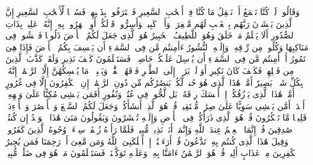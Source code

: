 \startbuffer[\q:67:10]
وَقَالُوا۟ لَوۡ كُنَّا نَسۡمَعُ أَوۡ نَعۡقِلُ مَا كُنَّا فِیۤ أَصۡحَٰبِ ٱلسَّعِیرِ%
\stopbuffer%
\startbuffer[\q:67:11]
فَٱعۡتَرَفُوا۟ بِذَنۢبِهِمۡ فَسُحۡقࣰا لِّأَصۡحَٰبِ ٱلسَّعِیرِ%
\stopbuffer%
\startbuffer[\q:67:12]
إِنَّ ٱلَّذِینَ یَخۡشَوۡنَ رَبَّهُم بِٱلۡغَیۡبِ لَهُم مَّغۡفِرَةࣱ وَأَجۡرࣱ كَبِیرࣱ%
\stopbuffer%
\startbuffer[\q:67:13]
وَأَسِرُّوا۟ قَوۡلَكُمۡ أَوِ ٱجۡهَرُوا۟ بِهِۦۤۖ إِنَّهُۥ عَلِیمُۢ بِذَاتِ ٱلصُّدُورِ%
\stopbuffer%
\startbuffer[\q:67:14]
أَلَا یَعۡلَمُ مَنۡ خَلَقَ وَهُوَ ٱللَّطِیفُ ٱلۡخَبِیرُ%
\stopbuffer%
\startbuffer[\q:67:15]
هُوَ ٱلَّذِی جَعَلَ لَكُمُ ٱلۡأَرۡضَ ذَلُولࣰا فَٱمۡشُوا۟ فِی مَنَاكِبِهَا وَكُلُوا۟ مِن رِّزۡقِهِۦۖ وَإِلَیۡهِ ٱلنُّشُورُ%
\stopbuffer%
\startbuffer[\q:67:16]
ءَأَمِنتُم مَّن فِی ٱلسَّمَاۤءِ أَن یَخۡسِفَ بِكُمُ ٱلۡأَرۡضَ فَإِذَا هِیَ تَمُورُ%
\stopbuffer%
\startbuffer[\q:67:17]
أَمۡ أَمِنتُم مَّن فِی ٱلسَّمَاۤءِ أَن یُرۡسِلَ عَلَیۡكُمۡ حَاصِبࣰاۖ فَسَتَعۡلَمُونَ كَیۡفَ نَذِیرِ%
\stopbuffer%
\startbuffer[\q:67:18]
وَلَقَدۡ كَذَّبَ ٱلَّذِینَ مِن قَبۡلِهِمۡ فَكَیۡفَ كَانَ نَكِیرِ%
\stopbuffer%
\startbuffer[\q:67:19]
أَوَ لَمۡ یَرَوۡا۟ إِلَى ٱلطَّیۡرِ فَوۡقَهُمۡ صَٰۤفَّٰتࣲ وَیَقۡبِضۡنَۚ مَا یُمۡسِكُهُنَّ إِلَّا ٱلرَّحۡمَٰنُۚ إِنَّهُۥ بِكُلِّ شَیۡءِۭ بَصِیرٌ%
\stopbuffer%
\startbuffer[\q:67:20]
أَمَّنۡ هَٰذَا ٱلَّذِی هُوَ جُندࣱ لَّكُمۡ یَنصُرُكُم مِّن دُونِ ٱلرَّحۡمَٰنِۚ إِنِ ٱلۡكَٰفِرُونَ إِلَّا فِی غُرُورٍ%
\stopbuffer%
\startbuffer[\q:67:21]
أَمَّنۡ هَٰذَا ٱلَّذِی یَرۡزُقُكُمۡ إِنۡ أَمۡسَكَ رِزۡقَهُۥۚ بَل لَّجُّوا۟ فِی عُتُوࣲّ وَنُفُورٍ%
\stopbuffer%
\startbuffer[\q:67:22]
أَفَمَن یَمۡشِی مُكِبًّا عَلَىٰ وَجۡهِهِۦۤ أَهۡدَىٰۤ أَمَّن یَمۡشِی سَوِیًّا عَلَىٰ صِرَٰطࣲ مُّسۡتَقِیمࣲ%
\stopbuffer%
\startbuffer[\q:67:23]
قُلۡ هُوَ ٱلَّذِیۤ أَنشَأَكُمۡ وَجَعَلَ لَكُمُ ٱلسَّمۡعَ وَٱلۡأَبۡصَٰرَ وَٱلۡأَفۡءِدَةَۚ قَلِیلࣰا مَّا تَشۡكُرُونَ%
\stopbuffer%
\startbuffer[\q:67:24]
قُلۡ هُوَ ٱلَّذِی ذَرَأَكُمۡ فِی ٱلۡأَرۡضِ وَإِلَیۡهِ تُحۡشَرُونَ%
\stopbuffer%
\startbuffer[\q:67:25]
وَیَقُولُونَ مَتَىٰ هَٰذَا ٱلۡوَعۡدُ إِن كُنتُمۡ صَٰدِقِینَ%
\stopbuffer%
\startbuffer[\q:67:26]
قُلۡ إِنَّمَا ٱلۡعِلۡمُ عِندَ ٱللَّهِ وَإِنَّمَاۤ أَنَا۠ نَذِیرࣱ مُّبِینࣱ%
\stopbuffer%
\startbuffer[\q:67:27]
فَلَمَّا رَأَوۡهُ زُلۡفَةࣰ سِیۤءَتۡ وُجُوهُ ٱلَّذِینَ كَفَرُوا۟ وَقِیلَ هَٰذَا ٱلَّذِی كُنتُم بِهِۦ تَدَّعُونَ%
\stopbuffer%
\startbuffer[\q:67:28]
قُلۡ أَرَءَیۡتُمۡ إِنۡ أَهۡلَكَنِیَ ٱللَّهُ وَمَن مَّعِیَ أَوۡ رَحِمَنَا فَمَن یُجِیرُ ٱلۡكَٰفِرِینَ مِنۡ عَذَابٍ أَلِیمࣲ%
\stopbuffer%
\startbuffer[\q:67:29]
قُلۡ هُوَ ٱلرَّحۡمَٰنُ ءَامَنَّا بِهِۦ وَعَلَیۡهِ تَوَكَّلۡنَاۖ فَسَتَعۡلَمُونَ مَنۡ هُوَ فِی ضَلَٰلࣲ مُّبِینࣲ%
\stopbuffer%
\startbuffer[\q:67:30]
